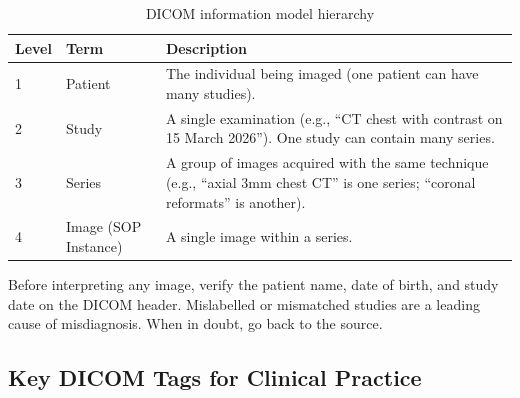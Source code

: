 \begin{table}[h]
\centering
\caption{DICOM information model hierarchy}
\begin{tabular}{|l|l|p{6cm}|}
\hline
\textbf{Level} & \textbf{Term} & \textbf{Description} \\
\hline
1 & Patient & The individual being imaged (one patient can have many studies). \\
\hline
2 & Study & A single examination (e.g., ``CT chest with contrast on 15 March 2026''). One study can contain many series. \\
\hline
3 & Series & A group of images acquired with the same technique (e.g., ``axial 3mm chest CT'' is one series; ``coronal reformats'' is another). \\
\hline
4 & Image (SOP Instance) & A single image within a series. \\
\hline
\end{tabular}
\end{table}

\begin{pearlbox}
Before interpreting any image, verify the patient name, date of birth, and study date on the DICOM header. Mislabelled or mismatched studies are a leading cause of misdiagnosis. When in doubt, go back to the source.
\end{pearlbox}

\subsection*{Key DICOM Tags for Clinical Practice}

